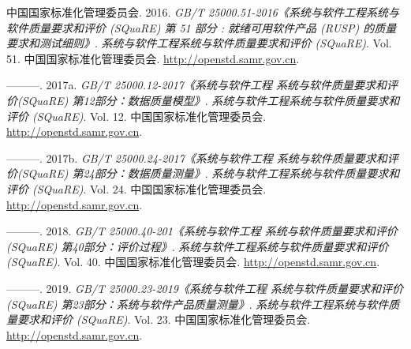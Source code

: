 \documentclass[hyperref, a4paper]{ctexart}
\begin{document}
\leavevmode\hypertarget{ref-innovative1}{}%
中国国家标准化管理委员会. 2016. \emph{GB/T
25000.51-2016《系统与软件工程系统与软件质量要求和评价 (SQuaRE) 第 51
部分 : 就绪可用软件产品 (RUSP) 的质量要求和测试细则》}.
\emph{系统与软件工程系统与软件质量要求和评价 (SQuaRE)}. Vol. 51.
中国国家标准化管理委员会. \url{http://openstd.samr.gov.cn}.

\leavevmode\hypertarget{ref-innovative3}{}%
---------. 2017a. \emph{GB/T 25000.12-2017《系统与软件工程
系统与软件质量要求和评价(SQuaRE) 第12部分：数据质量模型》}.
\emph{系统与软件工程系统与软件质量要求和评价 (SQuaRE)}. Vol. 12.
中国国家标准化管理委员会. \url{http://openstd.samr.gov.cn}.

\leavevmode\hypertarget{ref-innovative4}{}%
---------. 2017b. \emph{GB/T 25000.24-2017《系统与软件工程
系统与软件质量要求和评价(SQuaRE) 第24部分：数据质量测量》}.
\emph{系统与软件工程系统与软件质量要求和评价 (SQuaRE)}. Vol. 24.
中国国家标准化管理委员会. \url{http://openstd.samr.gov.cn}.

\leavevmode\hypertarget{ref-innovative5}{}%
---------. 2018. \emph{GB/T 25000.40-201《系统与软件工程
系统与软件质量要求和评价(SQuaRE) 第40部分：评价过程》}.
\emph{系统与软件工程系统与软件质量要求和评价 (SQuaRE)}. Vol. 40.
中国国家标准化管理委员会. \url{http://openstd.samr.gov.cn}.

\leavevmode\hypertarget{ref-innovative2}{}%
---------. 2019. \emph{GB/T 25000.23-2019《系统与软件工程
系统与软件质量要求和评价(SQuaRE) 第23部分：系统与软件产品质量测量》}.
\emph{系统与软件工程系统与软件质量要求和评价 (SQuaRE)}. Vol. 23.
中国国家标准化管理委员会. \url{http://openstd.samr.gov.cn}.
\end{document}
